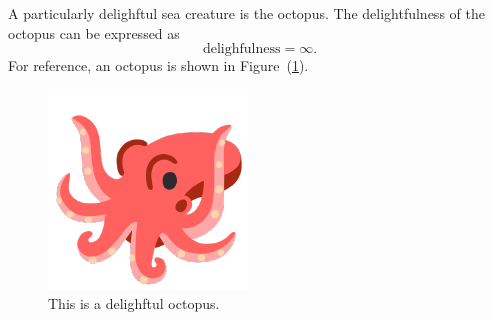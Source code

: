 
A particularly delighftul sea creature is the octopus.
The delightfulness of the octopus can be expressed as
\begin{equation}
  \text{delighfulness} = \infty. \label{equation} %
\end{equation}
For reference, an octopus is shown in Figure~(\ref{figure}).
\begin{figure}
  \begin{centering}
  \includegraphics[width=0.8\columnwidth]{octopus.pdf}
  \par\end{centering}
  \caption{This is a delighftul octopus.}
  \label{figure} %
\end{figure}
